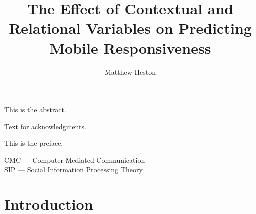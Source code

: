 \documentclass[12pt]{nuthesis}	%
\author{Matthew Heston}
\title{The Effect of Contextual and Relational Variables on Predicting Mobile Responsiveness}
\begin{document}
%	
%


\frontmatter		%

\maketitle		%

\copyrightpage		%


\abstract		%

This is the abstract.

\acknowledgements	%

Text for acknowledgments.

\preface		%

This is the preface.


%
\listofabbreviations
CMC --- Computer Mediated Communication \\
SIP --- Social Information Processing Theory
%
%
%
%
%
%
%

\clearpage{} %
\tableofcontents	%

\clearpage{} %
\listoftables		%

\clearpage{} %
\listoffigures		%



\mainmatter             %



\chapter{Introduction}
\end{document}
